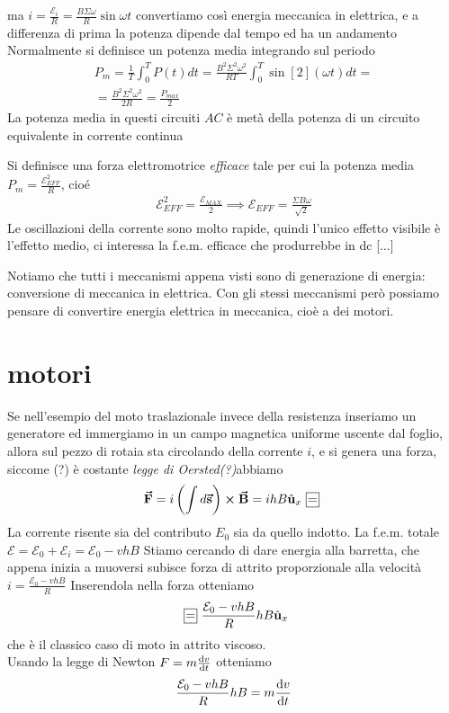 ma $i=\frac{\mathcal{E}_i}{R}=\frac{B\Sigma\omega}{R}\sin\omega t$
convertiamo così energia meccanica in elettrica, e a differenza di prima la potenza dipende dal tempo ed ha un andamento
Normalmente si definisce un potenza media integrando sul periodo
\begin{gather*}
	P_m=\frac{1}{T}\int^T_0 P(t)dt=\frac{B^2\Sigma^2\omega^2}{RT}\int^T_0 \sin[2](\omega t)dt=\\
	=\frac{B^2\Sigma^2\omega^2}{2R}=\frac{P_{max}}{2}
\end{gather*}
La potenza media in questi circuiti $AC$ è metà della potenza di un circuito equivalente in corrente continua

Si definisce una forza elettromotrice \textit{efficace} tale per cui la potenza media
$P_m=\frac{\mathcal{E}_{EFF}^2}{R}$, cioé 
\begin{gather*}
	\mathcal{E}_{EFF}^2=\frac{\mathcal{E}_{MAX}}{2} \implies \mathcal{E}_{EFF}=\frac{\Sigma B\omega}{\sqrt{2}}
\end{gather*}
Le oscillazioni della corrente sono molto rapide, quindi l'unico effetto visibile è l'effetto medio, ci interessa la f.e.m. efficace che produrrebbe in dc [...]

Notiamo che tutti i meccanismi appena visti sono di generazione di energia: conversione di meccanica in elettrica. Con gli stessi meccanismi però possiamo pensare di convertire energia elettrica in meccanica, cioè a dei motori.

\section{motori}
Se nell'esempio del moto traslazionale invece della resistenza inseriamo un generatore ed immergiamo in un campo magnetica uniforme uscente dal foglio, allora sul pezzo di rotaia sta circolando della corrente $i$, e si genera una forza, siccome (?) è costante \textit{legge di Oersted(?)}abbiamo
\begin{gather*}
	\vba F=i\left(\int d\vba s\right) \cross\vba B=ihB\vbh u_x\squarequal
\end{gather*}
La corrente risente sia del contributo $E_0$ sia da quello indotto.
La f.e.m. totale $\mathcal{E}=\mathcal{E}_0+\mathcal{E}_i=\mathcal{E}_0-vhB$
Stiamo cercando di dare energia alla barretta, che appena inizia a muoversi subisce forza di attrito proporzionale alla velocità $i=\frac{\mathcal{E}_0-vhB}{R}$
Inserendola nella forza otteniamo
\begin{gather*}
	\squarequal\frac{\mathcal{E}_0-vhB}{R}hB\vbh u_x
\end{gather*}
che è il classico caso di moto in attrito viscoso.\\
Usando la legge di Newton $F=m\dv{v}{t}$ otteniamo
\begin{gather*}
	\frac{\mathcal{E}_0-vhB}{R}hB=m\dv{v}{t}
\end{gather*}

